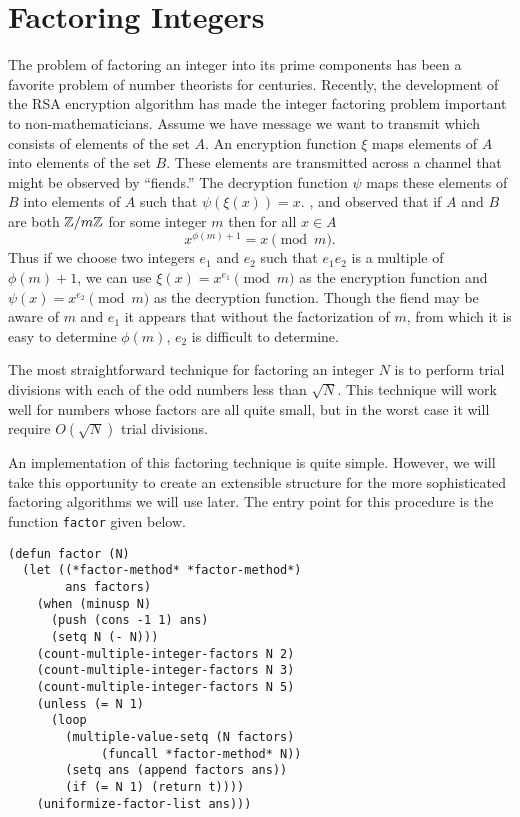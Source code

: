 
\chapter{Factoring Integers}
\label{Int:Factor:Chap}

The problem of factoring an integer into its prime components has been
a favorite problem of number theorists for centuries.  Recently, the
development of the RSA encryption algorithm \cite{Rivest78} has made
the integer factoring problem important to non-mathematicians.  Assume
we have message we want to transmit which consists of elements of the
set $A$.  An encryption function $\xi$ maps elements of $A$ into
elements of the set $B$.  These elements are transmitted across a
channel that might be observed by ``fiends.''  The decryption function
$\psi$ maps these elements of $B$ into elements of $A$ such that
$\psi(\xi(x)) = x$.  {\Rivest}, {\Shamir} and {\Adleman} observed that
if $A$ and $B$ are both $\mathbb{Z}/m\mathbb{Z}$ for some integer $m$ then for all $x
\in A$
\[
x^{\phi(m)+1} = x\pmod{m}.
\]
Thus if we choose two integers $e_{1}$ and $e_{2}$ such that $e_{1}e_{2}$
is a multiple of $\phi(m)+1$, we can use $\xi(x) = x^{e_{1}}\pmod{m}$ as the
encryption function and $\psi(x) = x^{e_{2}}\pmod{m}$ as the decryption
function.  Though the fiend may be aware of $m$ and $e_{1}$ it appears that
without the factorization of $m$, from which it is easy to determine
$\phi(m)$, $e_{2}$ is difficult to determine.  

The most straightforward technique for factoring an integer $N$ is to
perform trial divisions with each of the odd numbers less than $\sqrt{N}$.
This technique will work well for numbers whose factors are all quite
small, but in the worst case it will require $O(\sqrt{N})$ trial divisions.

An implementation of this factoring technique is quite simple.  However, we
will take this opportunity to create an extensible structure for the more
sophisticated factoring algorithms we will use later.  The entry point for
this procedure is the function {\tt factor} given below.  
\begin{verbatim}
(defun factor (N)
  (let ((*factor-method* *factor-method*)
        ans factors)
    (when (minusp N)
      (push (cons -1 1) ans)
      (setq N (- N)))
    (count-multiple-integer-factors N 2)
    (count-multiple-integer-factors N 3)
    (count-multiple-integer-factors N 5)
    (unless (= N 1)
      (loop
        (multiple-value-setq (N factors) 
             (funcall *factor-method* N))
        (setq ans (append factors ans))
        (if (= N 1) (return t))))
    (uniformize-factor-list ans)))
\end{verbatim}

